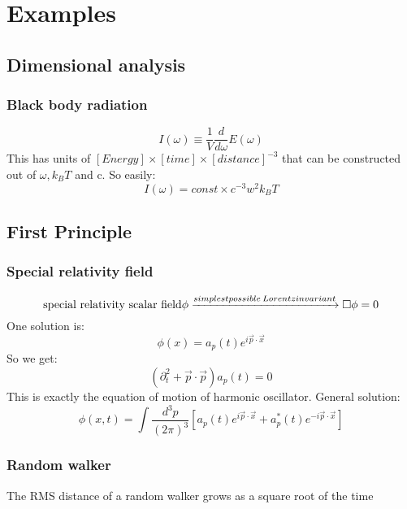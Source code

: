 \chapter{Examples}

\section{Dimensional analysis}

\subsection{Black body radiation}
\[ I(\omega) \equiv \frac{1}{V}\frac{d}{d\omega}E(\omega)\]
This has units of $[Energy] \times [time] \times [distance]^{-3}$ that can
be constructed out of $\omega, k_{B}T$ and c. So easily:
\[ I(\omega) = const \times c^{-3}w^{2}k_{B}T \]

\section{First Principle}
\subsection{Special relativity field}
\[ \text{special relativity scalar field}\phi \xrightarrow{simplest possible
\\ Lorentz invariant} \Box\phi = 0 \]
One solution is: 
\[ \phi(x) = a_p(t)e^{i\vec{p}\cdot\vec{x}}\]
So we get:
\[ (\partial^2_t + \vec{p}\cdot\vec{p})a_p(t) = 0 \]
This is exactly the equation of motion of harmonic oscillator.
General solution:
\[ \phi(x,t) = \int \frac{d^{3}p}{(2\pi)^3} [a_p(t)e^{i\vec{p}\cdot\vec{x}}
+ a_p^*(t)e^{-i\vec{p}\cdot\vec{x}}]\]

\subsection{Random walker}
The RMS distance of a random walker grows as a square root of the time
